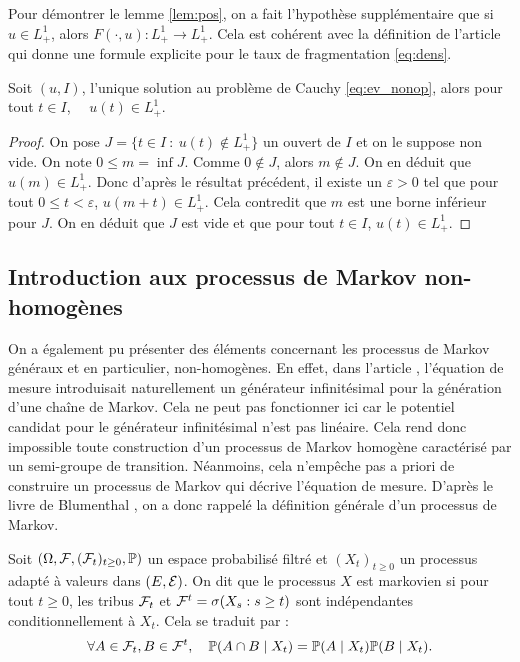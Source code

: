 \begin{rem}
	Pour démontrer le lemme \ref{lem:pos}, on a fait l'hypothèse supplémentaire que si $u \in L^1_+$, alors $F(\cdot , u) : L^1_+ \to L^1_+$. Cela est cohérent avec la définition de l'article \cite{geo} qui donne une formule explicite pour le taux de fragmentation \ref{eq:dens}.
\end{rem}

\begin{prop}{}{}
	Soit $(u,I)$, l'unique solution au problème de Cauchy \ref{eq:ev_nonop}, alors pour tout $t \in I$, $\quad u(t) \in L^1_+$.
\end{prop}

\begin{proof}
	On pose $J = \{t \in I \ : \ u(t) \notin L^1_+\}$ un ouvert de $I$ et on le suppose non vide. On note $0 \le m = \inf J$. Comme $0 \notin J$, alors $m \notin J$.
	On en déduit que $u(m) \in L^1_+$. Donc d'après le résultat précédent, il existe un $\varepsilon > 0$ tel que pour tout $0 \le  t < \varepsilon$,
	$u(m + t) \in L^1_+$. Cela contredit que $m$ est une borne inférieur pour $J$. On en déduit que $J$ est vide et que pour tout $t\in I$, $u(t) \in L^1_+$.
\end{proof}

\subsection{Introduction aux processus de Markov non-homogènes}

On a également pu présenter des éléments concernant les processus de Markov généraux et en particulier, non-homogènes. En effet, dans l'article \cite{frag_deaconu}, l'équation
de mesure introduisait naturellement un générateur infinitésimal pour la génération d'une chaîne de Markov. Cela ne peut pas fonctionner ici car le potentiel candidat pour le \og générateur infinitésimal \fg{} n'est pas linéaire.
Cela rend donc impossible toute construction d'un processus de Markov homogène caractérisé par un semi-groupe de transition.
Néanmoins, cela n'empêche pas a priori de construire un processus de Markov qui décrive l'équation de mesure. D'après le livre de Blumenthal \cite{blumenthal}, on a donc rappelé la définition générale d'un processus de Markov.

\begin{defn}{}{}
	Soit $(\Omega, \mathcal{F}, (\mathcal{F}_t)_{t \ge 0}, \mathbb{P})$ un espace probabilisé filtré et $(X_t)_{t \ge 0}$ un processus adapté à valeurs dans $(E, \mathcal{E})$. On dit que le processus $X$ est markovien
	si pour tout $t \ge 0$, les tribus $\mathcal{F}_t$ et $\mathcal{F}^t =\sigma(X_s : s \ge t)$ sont indépendantes conditionnellement à $X_t$. Cela se traduit par :
	\[
		\forall A \in \mathcal{F}_t, B \in \mathcal{F}^t, \quad \mathbb{P}(A \cap B \mid X_t) =  \mathbb{P}(A \mid X_t) \mathbb{P}(B \mid X_t).
	\]
\end{defn}

